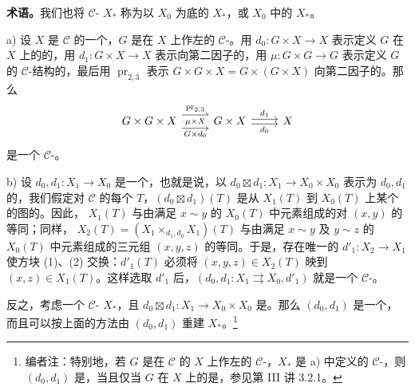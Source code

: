 \textbf{术语。}我们也将 $\mathcal C$- $X_*$ 称为以 $X_0$ 为底的 $X_*$，或 $X_0$ 中的 $X_*$。

a) 设 $X$ 是 $\mathcal C$ 的一个，$G$ 是在 $X$ 上作左的 $\mathcal C$-。用 $d_0:G\times X\to X$ 表示定义 $G$ 在 $X$ 上的的，用 $d_1:G\times X\to X$ 表示向第二因子的，用 $\mu:G\times G\to G$ 表示定义 $G$ 的 $\mathcal C$-结构的，最后用 $\operatorname{pr}_{2,3}$ 表示 $G\times G\times X=G\times(G\times X)$ 向第二因子的。那么
\[
\begin{tikzcd}
G\times G\times X\arrow[r,shift left=1.4ex,"{\operatorname{pr}_{2,3}}"]\arrow[r,"\mu\times X" description]\arrow[r,shift right=1.4ex,"G\times d_0"']&G\times X\arrow[r,shift left=.5ex,"d_1"]\arrow[r,shift right=.5ex,"d_0"']&X
\end{tikzcd}
\]
是一个 $\mathcal C$-。

b) 设 $d_0,d_1:X_1\to X_0$ 是一个，也就是说，以 $d_0\boxtimes d_1:X_1\to X_0\times X_0$ 表示为 $d_0,d_1$ 的，我们假定对 $\mathcal C$ 的每个 $T$，$(d_0\boxtimes d_1)(T)$ 是从 $X_1(T)$ 到 $X_0(T)$ 上某个的图的。因此， $X_1(T)$ 与由满足 $x\sim y$ 的 $X_0(T)$ 中元素组成的对 $(x,y)$ 的等同；同样， $X_2(T)=(X_1\times_{d_1,d_0}X_1)(T)$ 与由满足 $x\sim y$ 及 $y\sim z$ 的 $X_0(T)$ 中元素组成的三元组 $(x,y,z)$ 的等同。于是，存在唯一的 $d'_1:X_2\to X_1$ 使方块 (1)、(2) 交换：$d'_1(T)$ 必须将 $(x,y,z)\in X_2(T)$ 映到 $(x,z)\in X_1(T)$。这样选取 $d'_1$ 后，$(d_0,d_1:X_1\rightrightarrows X_0,d'_1)$ 就是一个 $\mathcal C$-。

反之，考虑一个 $\mathcal C$- $X_*$，且 $d_0\boxtimes d_1:X_1\to X_0\times X_0$ 是。那么 $(d_0,d_1)$ 是一个，而且可以按上面的方法由 $(d_0,d_1)$ 重建 $X_*$。\footnote{编者注：特别地，若 $G$ 是在 $\mathcal C$ 的 $X$ 上作左的 $\mathcal C$-，$X_*$ 是 a) 中定义的 $\mathcal C$-，则 $(d_0,d_1)$ 是，当且仅当 $G$ 在 $X$ 上的是，参见第 III 讲 3.2.1。}

